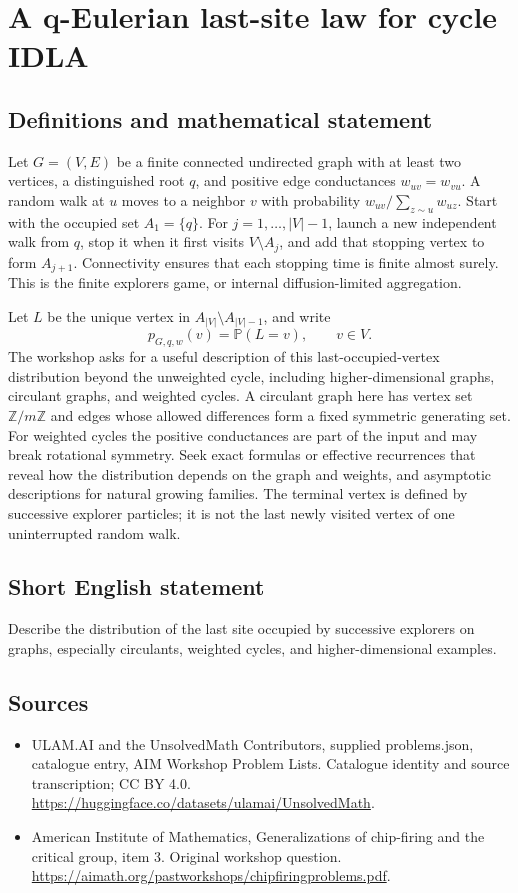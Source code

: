\documentclass[11pt,a4paper]{article}
\begin{document}
\section*{A q-Eulerian last-site law for cycle IDLA}\label{statement}

\subsection{Definitions and mathematical statement}
Let $G=(V,E)$ be a finite connected undirected graph with at least two vertices, a distinguished root $q$, and positive edge conductances $w_{uv}=w_{vu}$.
A random walk at $u$ moves to a neighbor $v$ with probability $w_{uv}/\sum_{z\sim u}w_{uz}$.
Start with the occupied set $A_1=\{q\}$.
For $j=1,\ldots,|V|-1$, launch a new independent walk from $q$, stop it when it first visits $V\setminus A_j$, and add that stopping vertex to form $A_{j+1}$.
Connectivity ensures that each stopping time is finite almost surely.
This is the finite explorers game, or internal diffusion-limited aggregation.

Let $L$ be the unique vertex in $A_{|V|}\setminus A_{|V|-1}$, and write
\[
 p_{G,q,w}(v)=\mathbb P(L=v),\qquad v\in V.
\]
The workshop asks for a useful description of this last-occupied-vertex distribution beyond the unweighted cycle, including higher-dimensional graphs, circulant graphs, and weighted cycles.
A circulant graph here has vertex set $\mathbb Z/m\mathbb Z$ and edges whose allowed differences form a fixed symmetric generating set.
For weighted cycles the positive conductances are part of the input and may break rotational symmetry.
Seek exact formulas or effective recurrences that reveal how the distribution depends on the graph and weights, and asymptotic descriptions for natural growing families.
The terminal vertex is defined by successive explorer particles; it is not the last newly visited vertex of one uninterrupted random walk.
\subsection{Short English statement}
Describe the distribution of the last site occupied by successive explorers on graphs, especially circulants, weighted cycles, and higher-dimensional examples.
\subsection{Sources}
\begin{itemize}
\item[S1] ULAM.AI and the UnsolvedMath Contributors, supplied problems.json, catalogue entry, AIM Workshop Problem Lists. Catalogue identity and source transcription; CC BY 4.0.
\url{https://huggingface.co/datasets/ulamai/UnsolvedMath}.
\item[S2] American Institute of Mathematics, Generalizations of chip-firing and the critical group, item 3. Original workshop question.
\url{https://aimath.org/pastworkshops/chipfiringproblems.pdf}.
\end{itemize}
\end{document}
